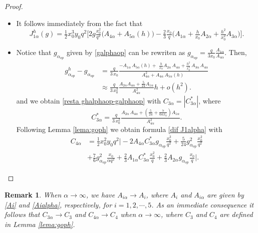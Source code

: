 \documentclass[11pt]{article}
\newtheorem{Remark}{Remark}
\begin{document}
    
    \begin{proof}
     $ $
     \begin{itemize}
     \item[(a)] It follows immediately from the fact that
     $${J^h_{1\alpha}(g)}=\tfrac{1}{2}x_0^3 y_0
 q^2\Big[  2g \tfrac{x_0^2}{q^2}\Big( A_{4\alpha} + A_{5\alpha}(h)\Big) - \tfrac{2}{3} \tfrac{x_0}{
      q} \Big( A_{1\alpha} + \tfrac{h}{x_0} A_{2\alpha} + \tfrac{h^2}{x_0^2} A_{3\alpha}\Big)\Big].$$


\item[(b)] Notice that $g_{\alpha_{op}}$ given by \eqref{galphaop} can be rewriten as $g_{\alpha_{op}}=\tfrac{q}{3x_0} \tfrac{A_{1\alpha}}{A_{4\alpha}}.$
Then,
 \[ \begin{array}{ll}
        {g^h_{\alpha_{op}}}-g_{\alpha_{op}} & = \tfrac{q}{3\,x_0}  \tfrac {-A_{1\alpha}\,A_{5\alpha}(h)+\,\,\tfrac{h}{x_0} A_{2\alpha}\, A_{4\alpha} + \tfrac{h^2}{x_0^2}\,A_{3\alpha}\,A_{4\alpha}   }{A_{4\alpha}^2 + A_{4\alpha} \,A_{5\alpha}(h)\,\,}\\[0.45cm]
   & \approx\tfrac{q}{3\,x_0^2} \tfrac{  A_{2\alpha}A_{4\alpha}+\tfrac{5}{24}A_{1\alpha} }{ A_{4\alpha}^2} h+o(h^2).
   \end{array}\]
    and we obtain \eqref{resta ghalphaop-galphaop} with $C_{3\alpha}=|C_{3\alpha}^*|$, where \begin{equation}\label{C3alpha*}
    C_{3\alpha}^*=\tfrac{q}{3\,x_0^2} \tfrac{ A_{2\alpha} \,A_{4\alpha}+ \left(\tfrac{5}{24}+\tfrac{7}{6 \alpha x_0}\right)A_{1\alpha} }{A_{4\alpha}^2}. 
    \end{equation}
 Following  Lemma \ref{lema:goph} we obtain formula \eqref{dif J1alpha} with 
 $$\begin{array}{ll}
 C_{4\alpha} &= \tfrac{1}{2} x_0^2 y_0 q^2  \Big|-2A_{4\alpha} C_{3\alpha}^* g_{\alpha_{op}}\tfrac{x_0^3}{q^2} +\tfrac{5}{24} g_{\alpha_{op}}^2\tfrac{x_0^2}{ q^2}\\[0.45cm]
 &+\tfrac{7}{6} g_{\alpha_{op}}^2\tfrac{x_0}{ \alpha q^2}+\tfrac{2}{3}A_{1\alpha} C_{3\alpha}^* \tfrac{x_0^2}{q}+\tfrac{2}{3} A_{2\alpha} g_{\alpha_{op}} \tfrac{x_0}{q} \Big|.
 \end{array}
$$
     \end{itemize}
    \end{proof}
\begin{Remark} When $\alpha\to \infty$, we have 
     $A_{i\alpha}\to A_i$,  where $A_i$ and $A_{i\alpha}$ are given by \eqref{Ai} and \eqref{Aialpha}, respectively, for $i=1,2,\cdots, 5$.
   As an immediate consequence it follows that $C_{3\alpha}\to C_3$ and $C_{4\alpha}\to C_4$ when $\alpha\to\infty$, where $C_3$ and $C_4$ are defined in Lemma \ref{lema:goph}.
\end{Remark}
\end{document}
